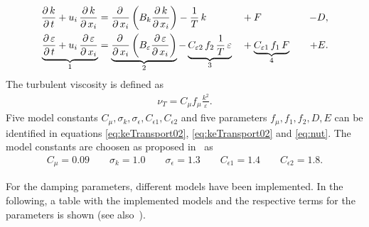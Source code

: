 \begin{alignat}{4} \label{eq:keTransport02}
		\frac{\partial\,k}{\partial\,t} + u_i\,\frac{\partial\,k}{\partial\,x_i}
		&=
		\frac{\partial\,}{\partial\,x_i}\left(  B_k \frac{\partial\,k}{\partial\,x_i} \right) 
		-
		\frac{1}{T}\,k
		&&+
		F
		&&&-
		D, \\ \label{eq:keTransport03}
		\underbrace{\frac{\partial\,\varepsilon}{\partial\,t} + u_i\,\frac{\partial\,\varepsilon}{\partial\,x_i}}_{1}
		&=
		\underbrace{\frac{\partial\,}{\partial\,x_i}\left( B_\varepsilon \frac{\partial\,\varepsilon}{\partial\,x_i} \right)}_{2} 
		-
		\underbrace{C_{\varepsilon 2}\,f_2\,\frac{1}{T}\,\varepsilon}_{3}
		&&+
		\underbrace{C_{\varepsilon 1}\,f_1\,F}_{4}
		&&&+
		E.
\end{alignat}
The turbulent viscosity is defined as
\begin{align}
\label{eq:nut}
	\nu_T = C_\mu f_\mu \frac{k^2}{\varepsilon}.
\end{align}
Five model constants $C_{\mu}, \sigma_k, \sigma_{\epsilon}, C_{\epsilon 1}, C_{\epsilon 2}$ and five parameters $f_{\mu}, f_1, f_2, D, E$ can be identified in equations \ref{eq:keTransport02}, \ref{eq:keTransport02} and \ref{eq:nut}. The model constants are choosen as proposed in~\citep{fan1993} as
\begin{align}\label{equ:constants}
    C_{\mu} = 0.09 \qquad
    \sigma_k = 1.0 \qquad
    \sigma_{\epsilon} = 1.3 \qquad
    C_{\epsilon 1} = 1.4 \qquad
    C_{\epsilon 2} = 1.8 .	
\end{align}

\noii For the damping parameters, different models have been implemented. In the following, a table with the implemented models and the respective terms for the parameters is shown (see also~\citep{fan1993}).

